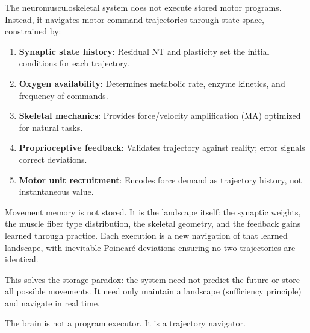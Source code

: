 \begin{principle}
The neuromusculoskeletal system does not execute stored motor programs. Instead, it navigates motor-command trajectories through state space, constrained by:

\begin{enumerate}[label=(\arabic*), noitemsep]
\item \textbf{Synaptic state history}: Residual NT and plasticity set the initial conditions for each trajectory.
\item \textbf{Oxygen availability}: Determines metabolic rate, enzyme kinetics, and frequency of commands.
\item \textbf{Skeletal mechanics}: Provides force/velocity amplification (MA) optimized for natural tasks.
\item \textbf{Proprioceptive feedback}: Validates trajectory against reality; error signals correct deviations.
\item \textbf{Motor unit recruitment}: Encodes force demand as trajectory history, not instantaneous value.
\end{enumerate}

Movement memory is not stored. It is the landscape itself: the synaptic weights, the muscle fiber type distribution, the skeletal geometry, and the feedback gains learned through practice. Each execution is a new navigation of that learned landscape, with inevitable Poincaré deviations ensuring no two trajectories are identical.

This solves the storage paradox: the system need not predict the future or store all possible movements. It need only maintain a landscape (sufficiency principle) and navigate in real time.

The brain is not a program executor. It is a trajectory navigator.
\end{principle}

